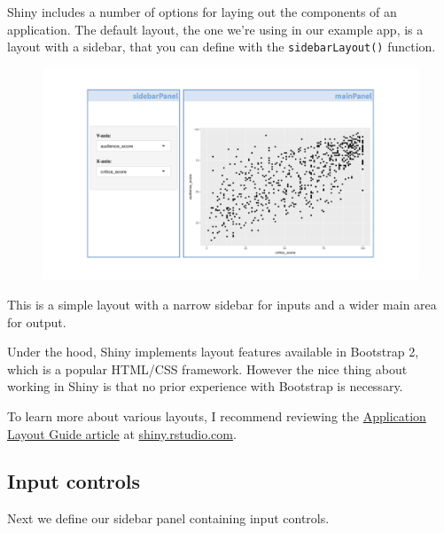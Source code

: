 \documentclass[
  letterpaper,
  DIV=11,
  numbers=noendperiod]{scrreprt}
\begin{document}
Shiny includes a number of options for laying out the components of an
application. The default layout, the one we're using in our example app,
is a layout with a sidebar, that you can define with the
\texttt{sidebarLayout()} function.

\begin{figure}

{\centering \includegraphics[width=1\textwidth,height=\textheight]{./images/layout-app.png}

}

\end{figure}

This is a simple layout with a narrow sidebar for inputs and a wider
main area for output.

Under the hood, Shiny implements layout features available in Bootstrap
2, which is a popular HTML/CSS framework. However the nice thing about
working in Shiny is that no prior experience with Bootstrap is
necessary.

To learn more about various layouts, I recommend reviewing the
\href{https://shiny.rstudio.com/articles/layout-guide.html}{Application
Layout Guide article} at \url{shiny.rstudio.com}.

\hypertarget{input-controls-1}{%
\subsection{Input controls}\label{input-controls-1}}

Next we define our sidebar panel containing input controls.
\end{document}
